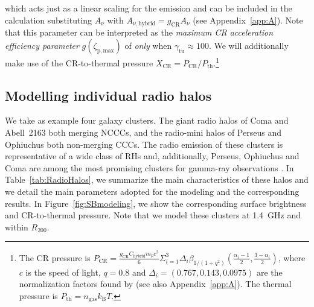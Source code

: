 \documentclass[traditabstract]{aa}
\newcommand{\rmn}{\mathrm}
\begin{document}
which acts just as
a linear scaling for the emission and can be included in the calculation
substituting $A_{\nu}$ with $A_{\nu,\rmn{hybrid}}=g_{\rmn{CR}}A_{\nu}$ (see
Appendix~\ref{app:A}). Note that this parameter can be interpreted as the
\emph{maximum CR acceleration efficiency parameter} $g(\zeta_{\rmn{p,max}})$ of
\cite{2010MNRAS.409..449P} \emph{only} when $\gamma_{\rmn{tu}}\approx100$. We
will additionally make use of the CR-to-thermal pressure
$X_{\rmn{CR}}=P_{\rmn{CR}}/P_{\rmn{th}}$.\footnote[11]{The CR pressure is
  $P_{\rmn{CR}}=\frac{g_{\rmn{CR}} C_{\rmn{hybrid}} m_{\rmn{p}} c^{2}}{6}
  \Sigma_{i=1}^{3} \Delta_{i} \beta_{1/(1+q^2)} \left(
    \frac{\alpha_{i}-1}{2},\frac{3-\alpha_{i}}{2} \right)$, where $c$ is the
  speed of light, $q=0.8$ \citep{2010MNRAS.409..449P} and $\Delta_{i} = (0.767,
  0.143, 0.0975)$ are the normalization factors found by
  \cite{2010MNRAS.409..449P} (see also Appendix~\ref{app:A}). The thermal
  pressure is $P_{\rmn{th}}=n_{\rmn{gas}}k_{\rmn{B}}T$.}

\subsection{Modelling individual radio halos}

We take as example four galaxy clusters. The giant radio halos of Coma \citep{1997A&A...321...55D} and Abell~2163 \citep{2001A&A...373..106F,2009A&A...499..679M} both merging NCCCs, and the radio-mini halos of Perseus \citep{1990MNRAS.246..477P} and Ophiuchus \citep{2009A&A...499..371G,2009A&A...499..679M} both non-merging CCCs. The radio emission of these clusters is representative of a wide class of RHs and, additionally, Perseus, Ophiuchus and Coma are among the most promising clusters for gamma-ray observations \citep{2010MNRAS.409..449P,2011arXiv1105.3240P}. In Table~\ref{tab:RadioHalos}, we summarize the main characteristics of these halos and we detail the main parameters adopted for the modeling and the corresponding results. In Figure~\ref{fig:SBmodeling}, we show the corresponding surface brightness and CR-to-thermal pressure. Note that we model these clusters at 1.4~GHz and within $R_{200}$.  
\end{document}

